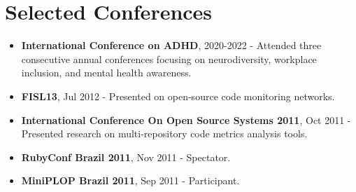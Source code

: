 
\section{Selected Conferences}

\begin{itemize}
    \item \footnotesize{\textbf{International Conference on ADHD},}\scriptsize{ 2020-2022 - Attended three consecutive annual conferences focusing on neurodiversity, workplace inclusion, and mental health awareness.}
    \item \footnotesize{\textbf{FISL13},}\scriptsize{ Jul 2012 - Presented on open-source code monitoring networks.}
    \item \footnotesize{\textbf{International Conference On Open Source Systems 2011},}\scriptsize{ Oct 2011 - Presented research on multi-repository code metrics analysis tools.}
    \item \footnotesize{\textbf{RubyConf Brazil 2011},}\scriptsize{ Nov 2011 - Spectator.}
    \item \footnotesize{\textbf{MiniPLOP Brazil 2011},}\scriptsize{ Sep 2011 - Participant.}
\end{itemize}
